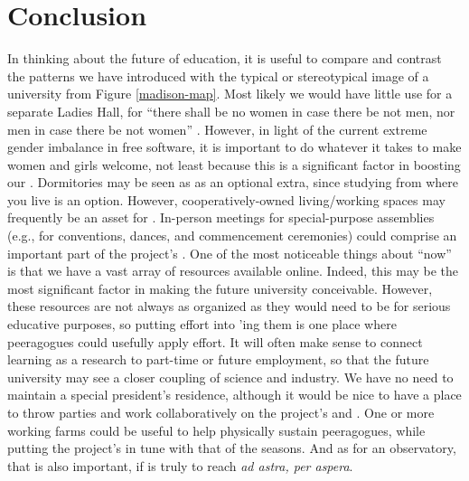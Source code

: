 \section{Conclusion}\label{sec:Conclusion}

In thinking about the future of education, it is useful to compare and
contrast the patterns we have introduced with the typical or
stereotypical image of a university from Figure \ref{madison-map}.
Most likely we would have little use for a separate Ladies Hall, for
``there shall be no women in case there be not men, nor men in case
there be not women'' \cite[Chapter 1.LII]{rabelais1894gargantua}.
However, in light of the current extreme gender imbalance in free
software, it is important to do whatever it takes to make women and
girls welcome, not least because this is a significant factor in
boosting our .  Dormitories may be seen
as as an optional extra, since studying from where you live is an
option.  However, cooperatively-owned living/working spaces may
frequently be an asset for .
In-person meetings for special-purpose assemblies (e.g., for
conventions, dances, and commencement ceremonies) could comprise an
important part of the project's .  One of the
most noticeable things about ``now'' is that we have a vast array of
resources available online.  Indeed, this may be the most significant
factor in making the future university conceivable.  However, these
resources are not always as organized as they would need to be for
serious educative purposes, so putting effort into
'ing them is one place where
peeragogues could usefully apply effort.  It will often make sense to
connect learning as a research  to part-time or
future employment, so that the future university may see a closer
coupling of science and industry.  We have no need to maintain a
special president's residence, although it would be nice to have a
place to throw parties and work collaboratively on the project's
 and .  One or more
working farms could be useful to help physically sustain peeragogues,
while putting the project's  in tune with that
of the seasons.  And as for an observatory, that is also important, if
 is truly to reach \emph{ad astra, per aspera}.


